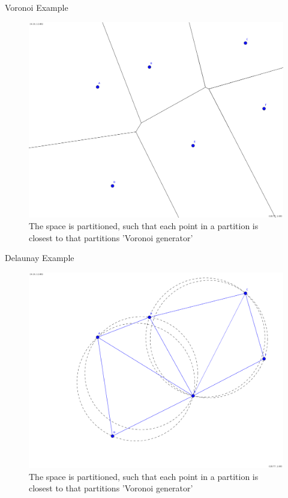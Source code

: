 \documentclass[8pt]{beamer}
\begin{document}
			
	\begin{frame}{Voronoi Example}
	\begin{figure}
	\centering
	\includegraphics[width=0.5\linewidth]{new_voronoi}
	\caption{The space is partitioned, such that each point in a partition is closest to that partitions 'Voronoi generator'}
	\label{voronoi}
\end{figure}
	\end{frame}

	\begin{frame}{Delaunay Example}
	\begin{figure}
	\centering
	\includegraphics[width=0.5\linewidth]{delaunay}
	\caption{The space is partitioned, such that each point in a partition is closest to that partitions 'Voronoi generator'}
	\label{delaunay}
\end{figure}
	\end{frame}
				
		
		
	
\end{document}
